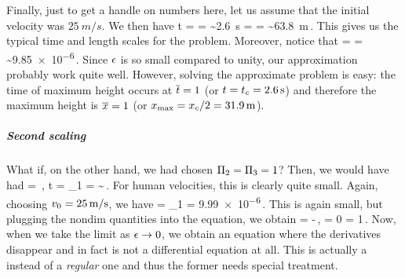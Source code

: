 Finally, just to get a handle on numbers here, let us assume that the initial velocity was $\SI{25}{m/s}$. We then have
\beq
\chpq t =  
        = 
        \sim\SI{2.6}{s}\quad
\chpq\lpos = 
           = 
           \sim\SI{63.8}{m}\,.
\eeq
This gives us the typical time and length scales for the problem. Moreover, notice that
\beq
\smpq = \dfrac{\chpq\lpos}{\radius}
      = 
      \sim\num{9.85e-6}\,.
\eeq
Since $\epsilon$ is so small compared to unity, our approximation probably work quite well. However, solving the approximate problem is easy: the time of maximum height occurs at $\overline{t} = 1$ (or $t = {t}_{c} = \SI{2.6}{s}$) and therefore the maximum height is $\overline{x} = 1$ (or $x_\text{max} = {x}_{c} / 2 = \SI{31.9}{m}$).


\subparagraph{Second scaling}
What if, on the other hand, we had chosen $\Pi_2 = \Pi_3 = 1$? Then, we would have had
\beq
\scpq\lpos = \radius\,,\quad
\scpq t = \quad{}\quad
\kdim_1 = 
        \sim{}\,.
\eeq
For human velocities, this is clearly quite small. Again, choosing $v_0 = \SI{25}{m/s}$, we have
\beq
\smpq = \kdim_1 = \num{9.99e-6}\,.
\eeq
This is again small, but plugging the nondim quantities into the equation, we obtain
\beq
\smpq\ddt{\scpq\lpos} = -\,,\quad
\scpq\lpos{} = 0\quad{}\quad
\dt{\scpq\lpos} = 1\,.
\eeq
Now, when we take the limit as $\epsilon\to 0$, we obtain an equation where the derivatives disappear and in fact is not a differential equation at all. This is actually a  instead of a \emph{regular} one and thus the former needs special treatment.
